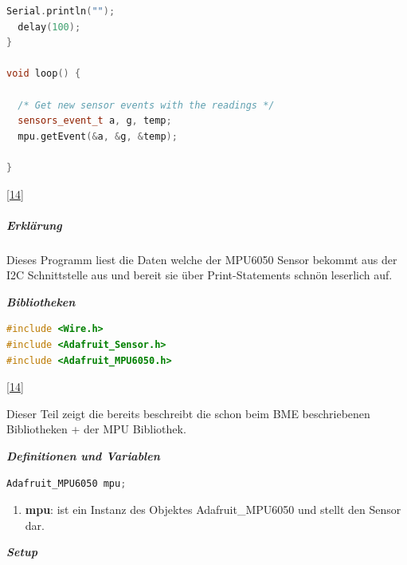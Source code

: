 \documentclass[
    headings=optiontotocandhead,%
    twoside,
    numbers=noenddot,%
    12pt, %
    titlepage, %
    parskip=full, %
    listof=leveldown, 
    numbers=noenddot, %
    a4paper,DIV=14,
    BCOR=15mm,
]{scrbook}
\providecommand{\tightlist}{%
  \setlength{\itemsep}{0pt}\setlength{\parskip}{0pt}}
\begin{document}
\begin{lstlisting}[language={C++}, caption={MPU Beispiel}]
  Serial.println("");
  delay(100);
}

void loop() {

  /* Get new sensor events with the readings */
  sensors_event_t a, g, temp;
  mpu.getEvent(&a, &g, &temp);

}
\end{lstlisting}

{[}\protect\hyperlink{ref-MPU6050-Test}{14}{]}

\hypertarget{erkluxe4rung-1}{%
\subparagraph{Erklärung}\label{erkluxe4rung-1}}

Dieses Programm liest die Daten welche der MPU6050 Sensor bekommt aus
der I2C Schnittstelle aus und bereit sie über Print-Statements schnön
leserlich auf.

\textbf{\emph{Bibliotheken}}

\begin{lstlisting}[language={C++}, caption={Dependencies MPU}]
#include <Wire.h>
#include <Adafruit_Sensor.h>
#include <Adafruit_MPU6050.h>
\end{lstlisting}

{[}\protect\hyperlink{ref-MPU6050-Test}{14}{]}

Dieser Teil zeigt die bereits beschreibt die schon beim BME
beschriebenen Bibliotheken + der MPU Bibliothek.

\textbf{\emph{Definitionen und Variablen}}

\begin{lstlisting}[language={C++}, caption={Definition und Variablen MPU}]
Adafruit_MPU6050 mpu;
\end{lstlisting}

\begin{enumerate}
\def\labelenumi{\arabic{enumi}.}
\setcounter{enumi}{1}
\tightlist
\item
  \textbf{mpu}: ist ein Instanz des Objektes Adafruit\_MPU6050 und
  stellt den Sensor dar.
\end{enumerate}

\textbf{\emph{Setup}}
\end{document}
